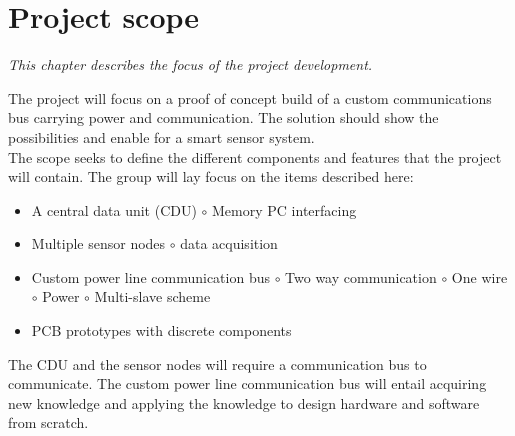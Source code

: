 \chapter{Project scope}
\textit{This chapter describes the focus of the project development.}

The project will focus on a proof of concept build of a custom communications bus carrying power and communication. The solution should show the possibilities and enable for a smart sensor system.\\
The scope seeks to define the different components and features that the project will contain. The group will lay focus on the items described here:
\begin{itemize}
	\item A central data unit (CDU)
	\subitem $\circ$ Memory
	\subitem  PC interfacing
	\item Multiple sensor nodes
	\subitem $\circ$ data acquisition
	\item Custom power line communication bus 
	\subitem $\circ$ Two way communication
	\subitem $\circ$ One wire
	\subitem $\circ$ Power
	\subitem $\circ$ Multi-slave scheme
	\item PCB prototypes with discrete components
\end{itemize}

The CDU and the sensor nodes will require a communication bus to communicate. The custom power line communication bus will entail acquiring new knowledge and applying the knowledge to design hardware and software from scratch. 
